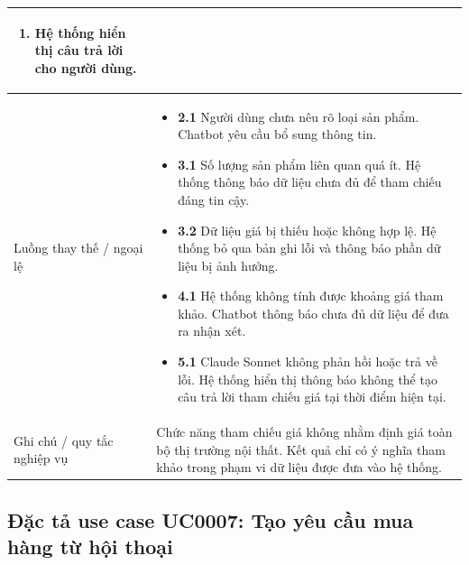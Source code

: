 \documentclass[../DoAn.tex]{subfiles}
\begin{document}
\begin{longtable}{|p{}|p{}|}
\begin{minipage}[t]{0.68\textwidth}
\begin{enumerate}
    \item Hệ thống hiển thị câu trả lời cho người dùng.
\end{enumerate}
\end{minipage}
\\
\hline
Luồng thay thế / ngoại lệ &
\begin{minipage}[t]{0.68\textwidth}
\begin{itemize}
    \item \textbf{2.1} Người dùng chưa nêu rõ loại sản phẩm. Chatbot yêu cầu bổ sung thông tin.
    \item \textbf{3.1} Số lượng sản phẩm liên quan quá ít. Hệ thống thông báo dữ liệu chưa đủ để tham chiếu đáng tin cậy.
    \item \textbf{3.2} Dữ liệu giá bị thiếu hoặc không hợp lệ. Hệ thống bỏ qua bản ghi lỗi và thông báo phần dữ liệu bị ảnh hưởng.
    \item \textbf{4.1} Hệ thống không tính được khoảng giá tham khảo. Chatbot thông báo chưa đủ dữ liệu để đưa ra nhận xét.
    \item \textbf{5.1} Claude Sonnet không phản hồi hoặc trả về lỗi. Hệ thống hiển thị thông báo không thể tạo câu trả lời tham chiếu giá tại thời điểm hiện tại.
\end{itemize}
\end{minipage}
\\
\hline
Ghi chú / quy tắc nghiệp vụ & Chức năng tham chiếu giá không nhằm định giá toàn bộ thị trường nội thất. Kết quả chỉ có ý nghĩa tham khảo trong phạm vi dữ liệu được đưa vào hệ thống. \\
\hline
\end{longtable}

\subsection{Đặc tả use case UC0007: Tạo yêu cầu mua hàng từ hội thoại}
\label{subsection:2.3.7}
\end{document}
